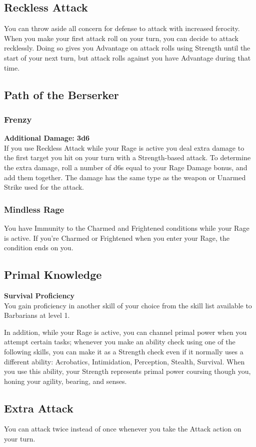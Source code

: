 \documentclass[letterpaper,openany,oneside,twocolumn]{book}
\begin{document}
\subsection*{Reckless Attack}
You can throw aside all concern for defense to attack with increased ferocity. When you make your first attack roll on your turn, you can decide to attack recklessly. Doing so gives you Advantage on attack rolls using Strength until the start of your next turn, but attack rolls against you have Advantage during that time.
\subsection*{Path of the Berserker}
\subsubsection*{Frenzy}
\textbf{Additional Damage: 3d6}\\
If you use Reckless Attack while your Rage is active you deal extra damage to the first target you hit on your turn with a Strength-based attack. To determine the extra damage, roll a number of d6s equal to your Rage Damage bonus, and add them together. The damage has the same type as the weapon or Unarmed Strike used for the attack.
\subsubsection*{Mindless Rage}
You have Immunity to the Charmed and Frightened conditions while your Rage is active. If you're Charmed or Frightened when you enter your Rage, the condition ends on you.
\subsection*{Primal Knowledge}
\textbf{Survival Proficiency}\\
You gain proficiency in another skill of your choice from the skill list available to Barbarians at level 1.

In addition, while your Rage is active, you can channel primal power when you attempt certain tasks; whenever you make an ability check using one of the following skills, you can make it as a Strength check even if it normally uses a different ability: Acrobatics, Intimidation, Perception, Stealth, Survival. When you use this ability, your Strength represents primal power coursing though you, honing your agility, bearing, and senses.
\subsection*{Extra Attack}
You can attack twice instead of once whenever you take the Attack action on your turn.
\end{document}
